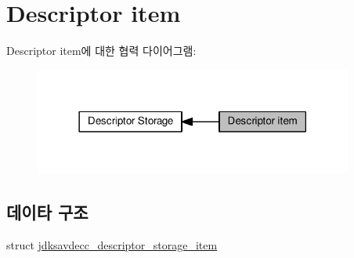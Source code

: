 \hypertarget{group__descriptor__storage__item}{}\section{Descriptor item}
\label{group__descriptor__storage__item}
Descriptor item에 대한 협력 다이어그램\+:
\nopagebreak
\begin{figure}[H]
\begin{center}
\leavevmode
\includegraphics[width=297pt]{group__descriptor__storage__item}
\end{center}
\end{figure}
\subsection*{데이타 구조}
\begin{DoxyCompactItemize}
\item 
struct \hyperlink{structjdksavdecc__descriptor__storage__item}{jdksavdecc\+\_\+descriptor\+\_\+storage\+\_\+item}
\end{DoxyCompactItemize}
